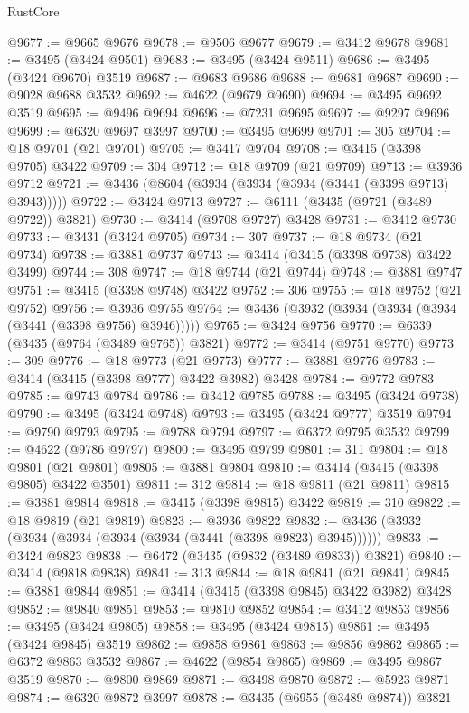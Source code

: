 \begin{lexlean}{RustCore}
\begin{coremodule}
@9677 := @9665 @9676
@9678 := @9506 @9677
@9679 := @3412 @9678
@9681 := @3495 (@3424 @9501)
@9683 := @3495 (@3424 @9511)
@9686 := @3495 (@3424 @9670) @3519
@9687 := @9683 @9686
@9688 := @9681 @9687
@9690 := @9028 @9688 @3532
@9692 := @4622 (@9679 @9690)
@9694 := @3495 @9692 @3519
@9695 := @9496 @9694
@9696 := @7231 @9695
@9697 := @9297 @9696
@9699 := @6320 @9697 @3997
@9700 := @3495 @9699
@9701 := 305
@9704 := @18 @9701 (@21 @9701)
@9705 := @3417 @9704
@9708 := @3415 (@3398 @9705) @3422
@9709 := 304
@9712 := @18 @9709 (@21 @9709)
@9713 := @3936 @9712
@9721 := @3436 (@8604 (@3934 (@3934 (@3934 (@3441 (@3398 @9713) @3943)))))
@9722 := @3424 @9713
@9727 := @6111 (@3435 (@9721 (@3489 @9722)) @3821)
@9730 := @3414 (@9708 @9727) @3428
@9731 := @3412 @9730
@9733 := @3431 (@3424 @9705)
@9734 := 307
@9737 := @18 @9734 (@21 @9734)
@9738 := @3881 @9737
@9743 := @3414 (@3415 (@3398 @9738) @3422 @3499)
@9744 := 308
@9747 := @18 @9744 (@21 @9744)
@9748 := @3881 @9747
@9751 := @3415 (@3398 @9748) @3422
@9752 := 306
@9755 := @18 @9752 (@21 @9752)
@9756 := @3936 @9755
@9764 := @3436 (@3932 (@3934 (@3934 (@3934 (@3441 (@3398 @9756) @3946)))))
@9765 := @3424 @9756
@9770 := @6339 (@3435 (@9764 (@3489 @9765)) @3821)
@9772 := @3414 (@9751 @9770)
@9773 := 309
@9776 := @18 @9773 (@21 @9773)
@9777 := @3881 @9776
@9783 := @3414 (@3415 (@3398 @9777) @3422 @3982) @3428
@9784 := @9772 @9783
@9785 := @9743 @9784
@9786 := @3412 @9785
@9788 := @3495 (@3424 @9738)
@9790 := @3495 (@3424 @9748)
@9793 := @3495 (@3424 @9777) @3519
@9794 := @9790 @9793
@9795 := @9788 @9794
@9797 := @6372 @9795 @3532
@9799 := @4622 (@9786 @9797)
@9800 := @3495 @9799
@9801 := 311
@9804 := @18 @9801 (@21 @9801)
@9805 := @3881 @9804
@9810 := @3414 (@3415 (@3398 @9805) @3422 @3501)
@9811 := 312
@9814 := @18 @9811 (@21 @9811)
@9815 := @3881 @9814
@9818 := @3415 (@3398 @9815) @3422
@9819 := 310
@9822 := @18 @9819 (@21 @9819)
@9823 := @3936 @9822
@9832 := @3436 (@3932 (@3934 (@3934 (@3934 (@3934 (@3441 (@3398 @9823) @3945))))))
@9833 := @3424 @9823
@9838 := @6472 (@3435 (@9832 (@3489 @9833)) @3821)
@9840 := @3414 (@9818 @9838)
@9841 := 313
@9844 := @18 @9841 (@21 @9841)
@9845 := @3881 @9844
@9851 := @3414 (@3415 (@3398 @9845) @3422 @3982) @3428
@9852 := @9840 @9851
@9853 := @9810 @9852
@9854 := @3412 @9853
@9856 := @3495 (@3424 @9805)
@9858 := @3495 (@3424 @9815)
@9861 := @3495 (@3424 @9845) @3519
@9862 := @9858 @9861
@9863 := @9856 @9862
@9865 := @6372 @9863 @3532
@9867 := @4622 (@9854 @9865)
@9869 := @3495 @9867 @3519
@9870 := @9800 @9869
@9871 := @3498 @9870
@9872 := @5923 @9871
@9874 := @6320 @9872 @3997
@9878 := @3435 (@6955 (@3489 @9874)) @3821

\end{coremodule}
\end{lexlean}

